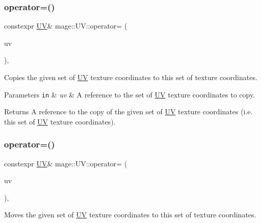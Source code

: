 \subsubsection{\texorpdfstring{operator=()}{operator=()}\hspace{0.1cm}{\footnotesize\ttfamily [1/2]}}
{\footnotesize\ttfamily constexpr \mbox{\hyperlink{structmage_1_1_u_v}{UV}}\& mage\+::\+U\+V\+::operator= (\begin{DoxyParamCaption}\item[{const \mbox{\hyperlink{structmage_1_1_u_v}{UV}} \&}]{uv }\end{DoxyParamCaption})\hspace{0.3cm}{\ttfamily [default]}, {\ttfamily [noexcept]}}

Copies the given set of \mbox{\hyperlink{structmage_1_1_u_v}{UV}} texture coordinates to this set of texture coordinates.


\begin{DoxyParams}[1]{Parameters}
\mbox{\tt in}  & {\em uv} & A reference to the set of \mbox{\hyperlink{structmage_1_1_u_v}{UV}} texture coordinates to copy. \\
\hline
\end{DoxyParams}
\begin{DoxyReturn}{Returns}
A reference to the copy of the given set of \mbox{\hyperlink{structmage_1_1_u_v}{UV}} texture coordinates (i.\+e. this set of \mbox{\hyperlink{structmage_1_1_u_v}{UV}} texture coordinates). 
\end{DoxyReturn}
\mbox{\label{structmage_1_1_u_v_a2737f10decab84904fbd16a3f213c470}} 
\subsubsection{\texorpdfstring{operator=()}{operator=()}\hspace{0.1cm}{\footnotesize\ttfamily [2/2]}}
{\footnotesize\ttfamily constexpr \mbox{\hyperlink{structmage_1_1_u_v}{UV}}\& mage\+::\+U\+V\+::operator= (\begin{DoxyParamCaption}\item[{\mbox{\hyperlink{structmage_1_1_u_v}{UV}} \&\&}]{uv }\end{DoxyParamCaption})\hspace{0.3cm}{\ttfamily [default]}, {\ttfamily [noexcept]}}

Moves the given set of \mbox{\hyperlink{structmage_1_1_u_v}{UV}} texture coordinates to this set of texture coordinates.


